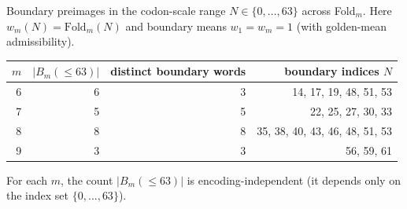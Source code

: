 Boundary preimages in the codon-scale range $N\in\{0,\dots,63\}$ across Fold$_m$.
Here $w_m(N)=\mathrm{Fold}_m(N)$ and boundary means $w_1=w_m=1$ (with golden-mean admissibility).

\begin{center}
\small
\setlength{\tabcolsep}{6pt}
\renewcommand{\arraystretch}{1.15}
\begin{tabular}{r r r r}
\toprule
$m$ & $|B_m(\le 63)|$ & distinct boundary words & boundary indices $N$ \\
\midrule
6 & 6 & 3 & 14, 17, 19, 48, 51, 53 \\
7 & 5 & 5 & 22, 25, 27, 30, 33 \\
8 & 8 & 8 & 35, 38, 40, 43, 46, 48, 51, 53 \\
9 & 3 & 3 & 56, 59, 61 \\
\bottomrule
\end{tabular}
\end{center}

For each $m$, the count $|B_m(\le 63)|$ is encoding-independent (it depends only on the index set $\{0,\dots,63\}$).

